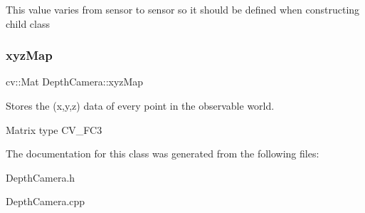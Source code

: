 This value varies from sensor to sensor so it should be defined when constructing child class \hypertarget{class_depth_camera_a10123e69a9879a27a2c5ae434a916a5e}{}\label{class_depth_camera_a10123e69a9879a27a2c5ae434a916a5e} 
\subsubsection{\texorpdfstring{xyz\+Map}{xyzMap}}
{\footnotesize\ttfamily cv\+::\+Mat Depth\+Camera\+::xyz\+Map\hspace{0.3cm}{\ttfamily [protected]}}



Stores the (x,y,z) data of every point in the observable world. 

Matrix type C\+V\+\_\+F\+C3 

The documentation for this class was generated from the following files\+:\begin{DoxyCompactItemize}
\item 
Depth\+Camera.\+h\item 
Depth\+Camera.\+cpp\end{DoxyCompactItemize}
